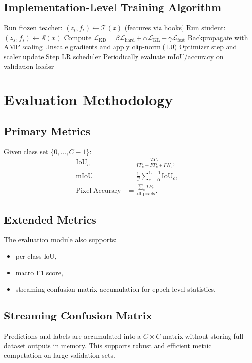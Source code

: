 \documentclass[journal]{IEEEtran}
\begin{document}
\subsection{Implementation-Level Training Algorithm}
\begin{algorithm}[t]
\caption{Student KD Training (per epoch)}
\begin{algorithmic}[1]
    \State Run frozen teacher: $(z_t, f_t)\leftarrow \mathcal{T}(x)$ (features via hooks)
    \State Run student: $(z_s, f_s)\leftarrow \mathcal{S}(x)$
    \State Compute $\mathcal{L}_{\text{KD}}=\beta\mathcal{L}_{\text{hard}}+\alpha\mathcal{L}_{\text{KL}}+\gamma\mathcal{L}_{\text{feat}}$
    \State Backpropagate with AMP scaling
    \State Unscale gradients and apply clip-norm ($1.0$)
    \State Optimizer step and scaler update
\EndFor
\State Step LR scheduler
\State Periodically evaluate mIoU/accuracy on validation loader
\end{algorithmic}
\end{algorithm}

\section{Evaluation Methodology}
\subsection{Primary Metrics}
Given class set $\{0,\dots,C-1\}$:
\begin{align}
\text{IoU}_c &= \frac{TP_c}{TP_c+FP_c+FN_c},\\
\text{mIoU} &= \frac{1}{C}\sum_{c=0}^{C-1}\text{IoU}_c,\\
\text{Pixel Accuracy} &= \frac{\sum_c TP_c}{\text{all pixels}}.
\end{align}

\subsection{Extended Metrics}
The evaluation module also supports:
\begin{itemize}
    \item per-class IoU,
    \item macro F1 score,
    \item streaming confusion matrix accumulation for epoch-level statistics.
\end{itemize}

\subsection{Streaming Confusion Matrix}
Predictions and labels are accumulated into a $C\times C$ matrix without storing full dataset outputs in memory. This supports robust and efficient metric computation on large validation sets.
\end{document}
